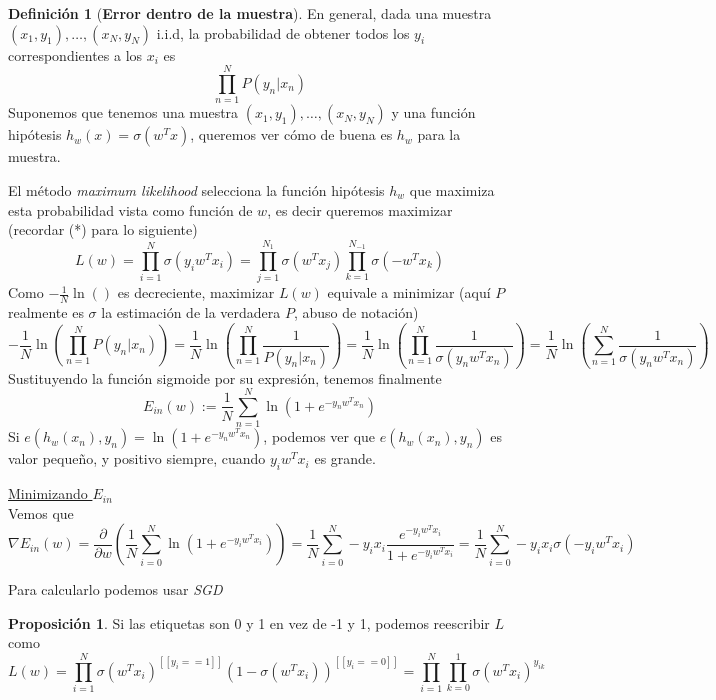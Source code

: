 \documentclass[11pt,a4paper]{article}
\theoremstyle{definition}
\newtheorem{definition}{Definición}[section]
\newtheorem{proposition}{Proposición}[section]
\begin{document}
	\begin{definition}[\bf Error dentro de la muestra]
		 En general, dada una muestra $(x_1,y_1),\ldots,(x_N, y_N)$ i.i.d, la probabilidad de obtener todos los $y_i$ correspondientes a los $x_i$ es
		$$\prod_{n=1}^N P(y_n | x_n)$$ 
		Suponemos que tenemos una muestra $(x_1,y_1),\ldots,(x_N, y_N)$ y una función hipótesis $h_w(x)=\sigma(w^Tx)$, queremos ver cómo de buena es $h_w$ para la muestra.
		
		El método \textit{maximum likelihood} selecciona la función hipótesis $h_w$ que maximiza esta probabilidad vista como función de $w$, es decir queremos maximizar (recordar (*) para lo siguiente)
	$$L(w)\iffalse=\prod_{i=1}^N P(y_i|x_i)\fi=\prod_{i=1}^N \sigma (y_i w^T x_i) = \prod_{j=1}^{N_1}\sigma (w^T x_j) \prod_{k=1}^{N_{-1}} \sigma(-w^Tx_k)$$
		Como $-\frac{1}{N} \ln()$ es decreciente, maximizar $L(w)$ equivale a minimizar (aquí $P$ realmente es $\sigma$ la estimación de la verdadera $P$, abuso de notación)
		$$-\frac{1}{N} \ln\left( \prod_{n=1}^N P(y_n| x_n)\right)=\frac{1}{N} \ln\left( \prod_{n=1}^N \frac{1}{P(y_n| x_n)}\right)=\frac{1}{N} \ln\left( \prod_{n=1}^N \frac{1}{\sigma(y_n w^T x_n)}\right)=\frac{1}{N} \ln\left( \sum_{n=1}^N \frac{1}{\sigma(y_n w^T x_n)}\right)$$
		Sustituyendo la función sigmoide por su expresión, tenemos finalmente
		$$E_{in}(w):=\frac{1}{N} \sum_{n=1}^N \ln \left(1+e^{-y_nw^Tx_n}\right)$$
		Si $e(h_w(x_n),y_n)=\ln (1+e^{-y_nw^T x_n})$, podemos ver que $e(h_w(x_n),y_n)$ es valor pequeño, y positivo siempre, cuando $y_iw^Tx_i$ es grande.
	\end{definition} 
	
	\underline{Minimizando $E_{in}$}\\
	
	Vemos que 
	$$\nabla E_{in}(w)=\frac{\partial}{\partial w} \left( \frac{1}{N} \sum_{i=0}^N \ln (1+e^{-y_i w^T x_i})\right)=\frac{1}{N}\sum_{i=0}^N -y_ix_i \frac{e^{-y_i w^T x_i}}{1+e^{-y_iw^Tx_i}}=\frac{1}{N}\sum_{i=0}^N -y_ix_i\sigma(-y_iw^Tx_i)$$
	
	Para calcularlo podemos usar \textit{SGD}
	
	\begin{proposition}
		Si las etiquetas son 0 y 1 en vez de -1 y 1, podemos reescribir $L$ como
		$$L(w)= \prod_{i=1}^N \sigma (w^Tx_i)^{[[y_i==1]]}(1-\sigma(w^Tx_i))^{[[y_i==0]]}=\prod_{i=1}^N \prod_{k=0}^1 \sigma(w^Tx_i)^{y_{ik}}$$
	\end{proposition}
\end{document}
